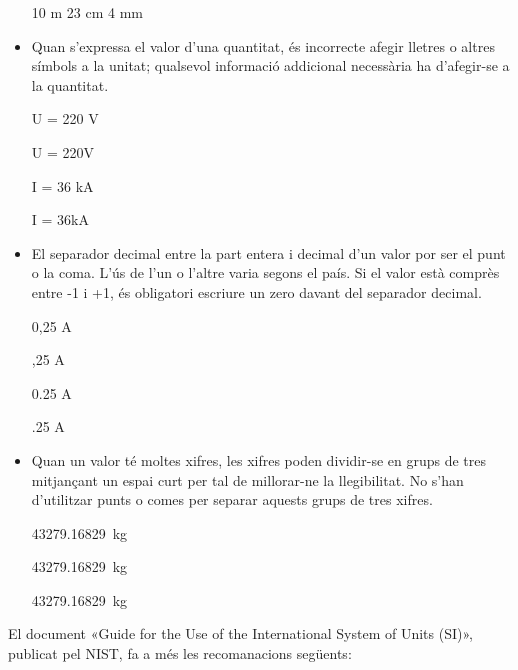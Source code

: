 \begin{itemize}
\textcolor{Red}\faTimesCircle{}  10 m 23 cm 4 mm


\item Quan s'expressa el valor d'una quantitat, és incorrecte afegir
lletres o altres símbols a la unitat; qualsevol informació
addicional necessària ha d'afegir-se a la quantitat.

\textcolor{Green}\faCheckSquare{} U = 220 V

\textcolor{Red}\faTimesCircle{}  U = 220\unit{V}

\textcolor{Green}\faCheckSquare{}  I = 36 kA

\textcolor{Red}\faTimesCircle{}   I = 36\unit{kA}


\item El separador decimal entre la part entera i decimal d'un valor por ser el punt o la coma. L'ús de l'un o l'altre varia segons el país. Si el valor està comprès entre -1 i +1, és obligatori escriure un zero davant del separador decimal.

\textcolor{Green}\faCheckSquare{} 0,25 A

\textcolor{Red}\faTimesCircle{}  ,25 A

\textcolor{Green}\faCheckSquare{} 0.25 A

\textcolor{Red}\faTimesCircle{}  .25 A


\item Quan un valor té moltes xifres, les xifres poden dividir-se en grups de tres mitjançant un espai curt per tal de millorar-ne la llegibilitat. No s'han d'utilitzar punts o comes per separar aquests grups de tres xifres.

\textcolor{Green}\faCheckSquare{} \SI{43279,16829}{kg}

\textcolor{Green}\faCheckSquare{} \SI[group-separator =]{43279,16829}{kg}

\textcolor{Red}\faTimesCircle{}  \SI[group-separator = .]{43279,16829}{kg}

\end{itemize}

El document  «Guide for the Use of the International System of Units (SI)», publicat pel NIST,  fa a més les recomanacions següents:

